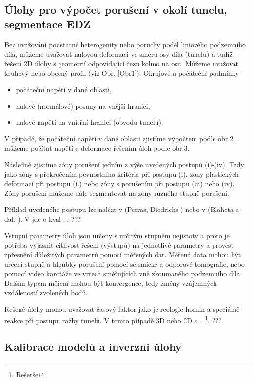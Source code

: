 \documentclass[a4paper]{article}
\newcommand{\alert}[1]{{\color{red}#1}}
\begin{document}
\subsection{Úlohy pro výpočet porušení v okolí tunelu, segmentace EDZ}

Bez uvažování podstatné heterogenity nebo poruchy podél liniového podzemního díla, můžeme uvažovat nulovou deformaci ve směru osy díla (tunelu) a tudíž řešení 2D úlohy s geometrií odpovídající řezu kolmo na osu. Můžeme uvažovat kruhový nebo obecný profil (viz Obr. \ref{Obr1}). Okrajové a počáteční podmínky
\begin{itemize}
	\item počáteční napětí v dané oblasti,
	\item nulové (normálové) posuny na vnější hranici,
	\item nulové napětí na vnitřní hranici (obvodu tunelu).
\end{itemize}

V případě, že počáteční napětí v dané oblasti zjistíme výpočtem podle obr.2, můžeme počítat napětí a deformace řešením úloh podle obr.3.

Následně zjistíme zóny porušení jedním z výše uvedených postupů (i)-(iv). Tedy jako zóny s překročením pevnostního kritéria při postupu (i), zóny plastických deformací při postupu (ii) nebo zóny s porušením při postupu (iii) nebo (iv). Zóny porušení můžeme dále segmentovat na zóny různého
stupně porušení.

Příklad uvedeného postupu lze nalézt v (Perras, Diedrichs \cite{18}) nebo v
(Blaheta a dal. \cite{13}). V \cite{18} jde o kval ... \alert{???}

Vstupní parametry úloh jsou určeny s určitým stupněm nejistoty a proto
je potřeba vyjasnit citlivost řešení (výstupů) na jednotlivé parametry a
provést zpřesnění důležitých parametrů pomocí měřených dat. Měřená data
mohou být určení stupně a hloubky porušení pomocí seismické a odporové
tomografie, nebo pomocí video karotáže ve vrtech směřujících vně zkoumaného
podzemního díla. Dalším typem měření mohou být konvergence, tedy
změny vzájemných vzdáleností zvolených bodů.

Řešené úlohy mohou uvažovat časový faktor jako je reologie hornin a
speciálně reakce při postupu ražby tunelů. V tomto případě 3D nebo 2D s
...\footnote{Rešerše}. \alert{???}

\subsection{Kalibrace modelů a inverzní úlohy}
\end{document}
